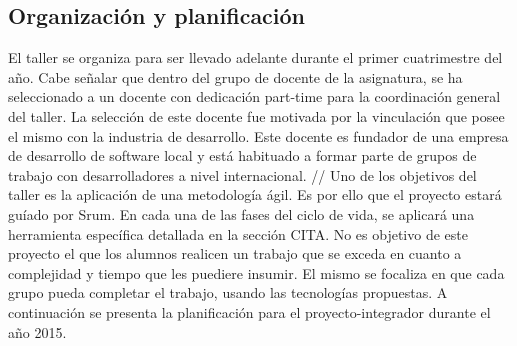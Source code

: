 \subsection{Organización y planificación}
El taller se organiza para ser llevado adelante durante el primer cuatrimestre del año. Cabe señalar
que dentro del grupo de docente de la asignatura, se ha seleccionado a un docente  con dedicación part-time para la coordinación general 
del taller. La selección de este docente fue motivada por la vinculación que posee el mismo con la industria de desarrollo. 
 Este docente es fundador de una empresa de desarrollo de software local y está habituado a formar parte de grupos de trabajo
con desarrolladores a nivel internacional. // 
Uno de los objetivos del taller es la aplicación de una metodología ágil. Es por ello que el proyecto estará guíado por Srum.
En cada una de las fases del ciclo de vida, se aplicará una herramienta específica detallada en la sección CITA. No es objetivo de este 
proyecto el que 
los alumnos realicen un trabajo que se exceda  en cuanto a complejidad y tiempo que les puediere insumir. El mismo se focaliza en que cada 
grupo pueda completar el trabajo, usando las tecnologías propuestas. A continuación se presenta la planificación para el proyecto-integrador
durante el año 2015.




